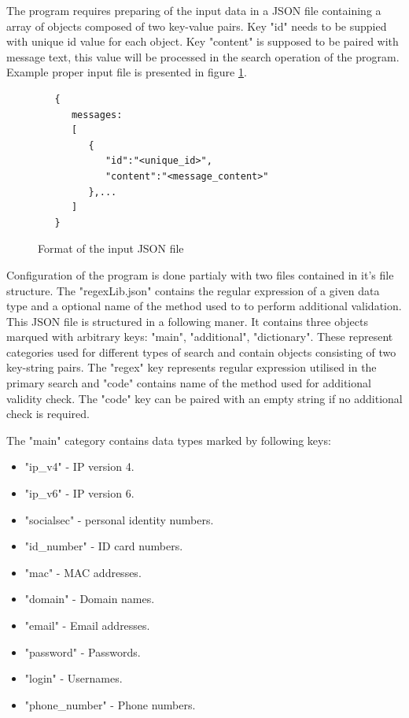 \documentclass[a4paper,twoside,12pt]{book}
\begin{document}
The program requires preparing of the input data in a JSON file containing
a array of objects composed of two key-value pairs. Key "id" needs to be 
suppied with unique id value for each object. Key "content" is supposed to be 
paired with message text, this value will be processed in the search operation 
of the program. Example proper input file is presented in figure \ref{fig:inputFormat}.

\begin{figure}
   \centering
   \begin{lstlisting}
   {
      messages:
      [
         {
            "id":"<unique_id>",
            "content":"<message_content>"
         },...
      ]
   }
   \end{lstlisting}
   \caption{Format of the input JSON file}
   \label{fig:inputFormat}
\end{figure}

Configuration of the program is done partialy with two files contained in it's
file structure. The "regexLib.json" contains the regular expression of a given
data type and a optional name of the method used to to perform additional 
validation. This JSON file is structured in a following maner. It contains
three objects marqued with arbitrary keys: "main", "additional", "dictionary".
These represent categories used for different types of search and contain
objects consisting of two key-string pairs. The "regex" key represents regular
expression utilised in the primary search and "code" contains name of the method 
used for additional validity check. The "code" key can be paired with an empty string
if no additional check is required.

The "main" category contains data types marked by following keys:

\begin{itemize}
   \item "ip\_v4" - IP version 4.
   \item "ip\_v6" - IP version 6.
   \item "socialsec" - personal identity numbers.
   \item "id\_number" - ID card numbers.
   \item "mac" - MAC addresses.
   \item "domain" - Domain names.
   \item "email" - Email addresses.
   \item "password" - Passwords.
   \item "login" - Usernames.
   \item "phone\_number" - Phone numbers.
\end{itemize} 
\end{document}
